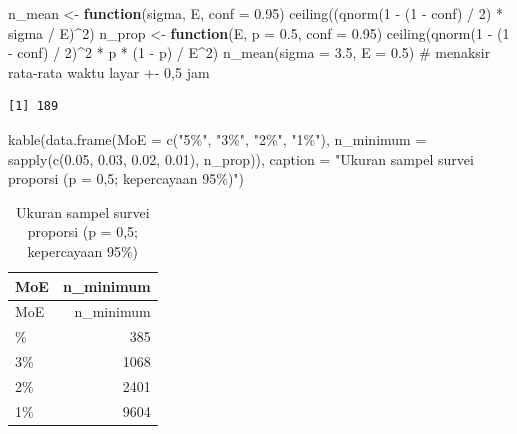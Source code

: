 \documentclass[
  indonesian,
  letterpaper,
]{book}
\newenvironment{Shaded}{\begin{snugshade}}{\end{snugshade}}
\newcommand{\AttributeTok}[1]{\textcolor[rgb]{0.40,0.45,0.13}{#1}}
\newcommand{\CommentTok}[1]{\textcolor[rgb]{0.37,0.37,0.37}{#1}}
\newcommand{\ControlFlowTok}[1]{\textcolor[rgb]{0.00,0.23,0.31}{\textbf{#1}}}
\newcommand{\DecValTok}[1]{\textcolor[rgb]{0.68,0.00,0.00}{#1}}
\newcommand{\FloatTok}[1]{\textcolor[rgb]{0.68,0.00,0.00}{#1}}
\newcommand{\FunctionTok}[1]{\textcolor[rgb]{0.28,0.35,0.67}{#1}}
\newcommand{\NormalTok}[1]{\textcolor[rgb]{0.00,0.23,0.31}{#1}}
\newcommand{\OtherTok}[1]{\textcolor[rgb]{0.00,0.23,0.31}{#1}}
\newcommand{\SpecialCharTok}[1]{\textcolor[rgb]{0.37,0.37,0.37}{#1}}
\newcommand{\StringTok}[1]{\textcolor[rgb]{0.13,0.47,0.30}{#1}}
\begin{document}
\begin{Shaded}
\begin{Highlighting}[]
\NormalTok{n\_mean }\OtherTok{\textless{}{-}} \ControlFlowTok{function}\NormalTok{(sigma, E, }\AttributeTok{conf =} \FloatTok{0.95}\NormalTok{) }\FunctionTok{ceiling}\NormalTok{((}\FunctionTok{qnorm}\NormalTok{(}\DecValTok{1} \SpecialCharTok{{-}}\NormalTok{ (}\DecValTok{1} \SpecialCharTok{{-}}\NormalTok{ conf) }\SpecialCharTok{/} \DecValTok{2}\NormalTok{) }\SpecialCharTok{*}\NormalTok{ sigma }\SpecialCharTok{/}\NormalTok{ E)}\SpecialCharTok{\^{}}\DecValTok{2}\NormalTok{)}
\NormalTok{n\_prop }\OtherTok{\textless{}{-}} \ControlFlowTok{function}\NormalTok{(E, }\AttributeTok{p =} \FloatTok{0.5}\NormalTok{, }\AttributeTok{conf =} \FloatTok{0.95}\NormalTok{) }\FunctionTok{ceiling}\NormalTok{(}\FunctionTok{qnorm}\NormalTok{(}\DecValTok{1} \SpecialCharTok{{-}}\NormalTok{ (}\DecValTok{1} \SpecialCharTok{{-}}\NormalTok{ conf) }\SpecialCharTok{/} \DecValTok{2}\NormalTok{)}\SpecialCharTok{\^{}}\DecValTok{2} \SpecialCharTok{*}\NormalTok{ p }\SpecialCharTok{*}\NormalTok{ (}\DecValTok{1} \SpecialCharTok{{-}}\NormalTok{ p) }\SpecialCharTok{/}\NormalTok{ E}\SpecialCharTok{\^{}}\DecValTok{2}\NormalTok{)}
\FunctionTok{n\_mean}\NormalTok{(}\AttributeTok{sigma =} \FloatTok{3.5}\NormalTok{, }\AttributeTok{E =} \FloatTok{0.5}\NormalTok{) }\CommentTok{\# menaksir rata{-}rata waktu layar +{-} 0,5 jam}
\end{Highlighting}
\end{Shaded}

\begin{verbatim}
[1] 189
\end{verbatim}

\begin{Shaded}
\begin{Highlighting}[]
\FunctionTok{kable}\NormalTok{(}\FunctionTok{data.frame}\NormalTok{(}\AttributeTok{MoE =} \FunctionTok{c}\NormalTok{(}\StringTok{"5\%"}\NormalTok{, }\StringTok{"3\%"}\NormalTok{, }\StringTok{"2\%"}\NormalTok{, }\StringTok{"1\%"}\NormalTok{),}
                 \AttributeTok{n\_minimum =} \FunctionTok{sapply}\NormalTok{(}\FunctionTok{c}\NormalTok{(}\FloatTok{0.05}\NormalTok{, }\FloatTok{0.03}\NormalTok{, }\FloatTok{0.02}\NormalTok{, }\FloatTok{0.01}\NormalTok{), n\_prop)),}
      \AttributeTok{caption =} \StringTok{"Ukuran sampel survei proporsi (p = 0,5; kepercayaan 95\%)"}\NormalTok{)}
\end{Highlighting}
\end{Shaded}

\begin{longtable}[]{@{}lr@{}}
\caption{Ukuran sampel survei proporsi (p = 0,5; kepercayaan
95\%)}\tabularnewline
\toprule\noalign{}
MoE & n\_minimum \\
\midrule\noalign{}
\endfirsthead
\toprule\noalign{}
MoE & n\_minimum \\
\midrule\noalign{}
\endhead
\bottomrule\noalign{}
\endlastfoot
5\% & 385 \\
3\% & 1068 \\
2\% & 2401 \\
1\% & 9604 \\
\end{longtable}
\end{document}
